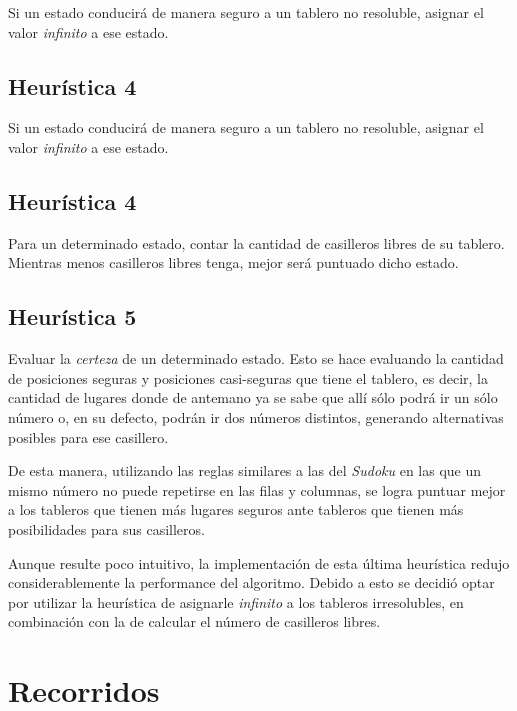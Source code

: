 \documentclass[%
    final,
    reprint,
    notitlepage,
    narroweqnarray,
    inline,
    twoside,
    invited
    ]{ieee}
\begin{document}
\par Si un estado conducirá de manera seguro a un tablero no resoluble, asignar el valor \textit{infinito} a ese estado.

\subsection{Heurística 4}

\par Si un estado conducirá de manera seguro a un tablero no resoluble, asignar el valor \textit{infinito} a ese estado.

\subsection{Heurística 4}

\par Para un determinado estado, contar la cantidad de casilleros libres de su tablero. Mientras menos casilleros libres tenga, mejor será puntuado dicho estado.

\subsection{Heurística 5}

\par Evaluar la \textit{certeza} de un determinado estado. Esto se hace evaluando la cantidad de posiciones seguras y posiciones casi-seguras que tiene el tablero, es decir, la cantidad de lugares donde de antemano ya se sabe que allí sólo podrá ir un sólo número o, en su defecto, podrán ir dos números distintos, generando alternativas posibles para ese casillero.\\
\par De esta manera, utilizando las reglas similares a las del \textit{Sudoku} en las que un mismo número no puede repetirse en las filas y columnas, se logra puntuar mejor a los tableros que tienen más lugares seguros ante tableros que tienen más posibilidades para sus casilleros.\\

\par Aunque resulte poco intuitivo, la implementación de esta última heurística redujo considerablemente la performance del algoritmo. Debido a esto se decidió optar por utilizar la heurística de asignarle \textit{infinito} a los tableros irresolubles, en combinación con la de calcular el número de casilleros libres.

\section{Recorridos}
\end{document}
